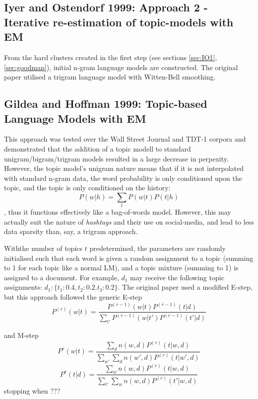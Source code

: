 \documentclass{article}
\begin{document}
\subsection{Iyer and Ostendorf 1999: Approach 2 - Iterative re-estimation of topic-models with EM}
From the hard clusters created in the first step (see sections \ref{sec:IO1}, \ref{sec:goodman}), initial n-gram language models are constructed. The original paper utilised a trigram language model with Witten-Bell smoothing.

\subsection{Gildea and Hoffman 1999: Topic-based Language Models with EM}
This approach was tested over the Wall Street Journal and TDT-1 corpora and demonstrated that the addition of a topic modell to standard unigram/bigram/trigram models resulted in a large decrease in perpexity. However, the topic model's unigram nature means that if it is not interpolated with standard n-gram data, the word probability is only conditioned upon the topic, and the topic is only conditioned on the history:
$$P(w|h) = \sum_{t}P(w|t)P(t|h)$$,
thus it functions effectively like a bag-of-words model. However, this may actually suit the nature of \textit{hashtags} and their use on social-media, and lead to less data sparsity than, say, a trigram approach.

Withthe number of topics $t$ predetermined, the parameters are randomly initialised such that each word is given a random assignment to a topic (summing to 1 for each topic like a normal LM), and a topic mixture (summing to 1) is assigned to a document. For example, $d_1$ may receive the following topic assignments: $d_1: \{t_1:0.4, t_2: 0.2. t_3: 0.2\}$.
The original paper used a modified E-step, but this approach followed the generic E-step
\begin{equation}
P^{(r)}(w|t) = \frac{P^{(r-1)}(w|t)P^{(r-1)}(t|d)}{\sum_{t'}P^{(r-1)}(w|t')P^{(r-1)}(t'|d)}
\end{equation}

and M-step
\begin{equation}
P^{r}(w|t) = \frac{\sum_{d}n(w,d)P^{(r)}(t|w,d)}{\sum_{w'}\sum_{d}n(w',d)P^{(r)}(t|w',d)}
\end{equation}
\begin{equation}
P^{r}(t|d) = \frac{\sum_{w}n(w,d)P^{(r)}(t|w,d)}{\sum_{t'}\sum_{w}n(w,d)P^{(r)}(t'|w,d)}
\end{equation}
stopping when ??? %
\end{document}
